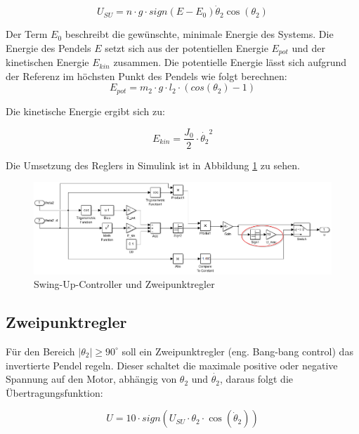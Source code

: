 \begin{equation}
U_{SU} = n \cdot g \cdot sign(E-E_0)\dot{\theta}_2\cos(\theta_2)
\end{equation}

Der Term $E_0$ beschreibt die gewünschte, minimale Energie des Systems. Die Energie des Pendels $E$ setzt sich aus der potentiellen Energie $E_{pot}$ und der kinetischen Energie $E_{kin}$ zusammen. Die potentielle Energie lässt sich aufgrund der Referenz im höchsten Punkt des Pendels wie folgt berechnen:
\begin{equation}
E_{pot} = m_2 \cdot g \cdot l_2 \cdot (cos(\theta_2)-1)
\end{equation}

Die kinetische Energie ergibt sich zu:

\begin{equation}
E_{kin} = \frac{J_0}{2} \cdot \dot{\theta_2}^2
\end{equation}

Die Umsetzung des Reglers in Simulink ist in Abbildung \ref{fig.Simu_Swing-Up} zu sehen. 

\begin{figure}[h!]
  \centering	
  	\includegraphics[width=1\textwidth]{Grafiken/simulink_swingup.png}
      \caption{Swing-Up-Controller und Zweipunktregler}
	\label{fig.Simu_Swing-Up}
\end{figure}


\subsection{Zweipunktregler}
\label{zweipunktregler} 

Für den Bereich $\left| \theta_2 \right| \geq 90^\circ$ soll ein Zweipunktregler (eng. Bang-bang control) das invertierte Pendel regeln. Dieser schaltet die maximale positive oder negative Spannung auf den Motor, abhängig von $ \theta_2 $ und $ \dot{\theta_2} $, daraus folgt die Übertragungsfunktion:

\begin{equation}
U = 10 \cdot sign(U_{SU} \cdot \theta_2 \cdot \cos(\dot{\theta}_2))
\end{equation}

